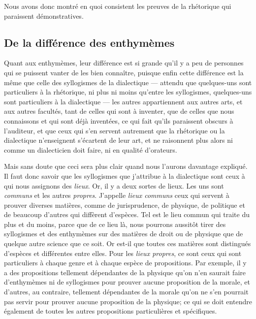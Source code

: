 \begin{flushleft}
Nous avons donc montré en quoi consistent les preuves de la rhétorique qui paraissent démonstratives.

\subsection{De la différence des enthymèmes}

Quant aux enthymèmes, leur différence est si grande qu'il y a peu de personnes qui se puissent vanter de les bien connaître, puisque enfin cette
différence est la même que celle des  syllogismes de la dialectique --- attendu que quelques-uns sont particuliers à la rhétorique, ni plus ni moins
qu'entre les syllogismes, quelques-uns sont particuliers à la dialectique --- les autres  appartiennent aux autres arts, et aux autres facultés, tant
de celles qui sont à inventer, que de celles que nous connaissons et qui sont déjà inventées, ce qui fait qu'ils paraissent obscurs à l'auditeur, et
que ceux qui s'en servent autrement que la rhétorique ou la dialectique n'enseignent s'écartent de leur art, et ne raisonnent  plus alors ni comme un
dialecticien doit faire, ni en qualité d'orateurs.

Mais sans doute que ceci sera plus clair quand nous l'aurons davantage expliqué. Il faut donc savoir que les syllogismes que j'attribue à la dialectique
sont ceux à qui nous assignons des \emph{lieux}. Or, il y a deux sortes de lieux. Les uns sont \emph{communs} et les autres \emph{propres}. J'appelle
\emph{lieux communs} ceux qui servent à prouver diverses matières, comme de jurisprudence, de physique, de politique et de beaucoup d'autres qui diffèrent
d'espèces. Tel est le lieu commun qui traite du plus et du moins, parce que de ce lieu là, nous pourrons aussitôt tirer des syllogismes et des enthymèmes
sur des matières de droit ou de physique que de quelque autre science que ce soit. Or est-il que toutes ces matières sont distingués d'espèces et
différentes entre elles. Pour les \emph{lieux propres}, ce sont ceux qui sont particuliers à chaque genre et à chaque espèce de propositions. Par exemple,
il y a des propositions tellement dépendantes de la physique qu'on n'en saurait faire d'enthymèmes ni de syllogismes pour prouver aucune proposition de la
morale, et d'autres, au contraire, tellement dépendantes de la morale qu'on ne s'en pourrait pas servir pour prouver aucune proposition de la physique; ce
qui se doit entendre également de toutes les autres propositions particulières et spécifiques.

\bigbreak


\end{flushleft}
